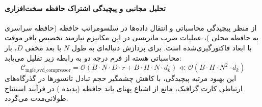 \paragraph{تحلیل مجانبی و پیچیدگی اشتراک حافظه سخت‌افزاری}
از منظر پیچیدگی محاسباتی و انتقال داده‌ها در سلسومراتب حافظه (حافظه سراسری  به حافظه محلی )، عملیات ضرب ماتریسی در این مکانیزم نیازمند تخصیص بافر موقت با ابعاد فاکتورگیری‌شده است. برای پردازش دنباله‌ای به طول $N$ با بعد مخفی $D$، بار محاسباتی هسته از فرم درجه دو به رابطه زیر تقلیل می‌یابد:
\begin{equation}
\label{eq:complexity_mgie_svd_compressor}
\mathcal{C}_{\text{mgie\_svd\_compressor}} = \mathcal{O}\left( B \cdot N \cdot D \cdot r + B \cdot H \cdot N \cdot d_k \right) \ll \mathcal{O}\left( B \cdot H \cdot N^2 \cdot d_k \right)
\end{equation}
این بهبود مرتبه پیچیدگی، با کاهش چشمگیر حجم تبادل تانسورها در گذرگاه‌های ارتباطی کارت گرافیک، مانع از اشباع پهنای باند حافظه (پدیده ) در فرآیند استنتاج طولانی‌مدت می‌گردد.
